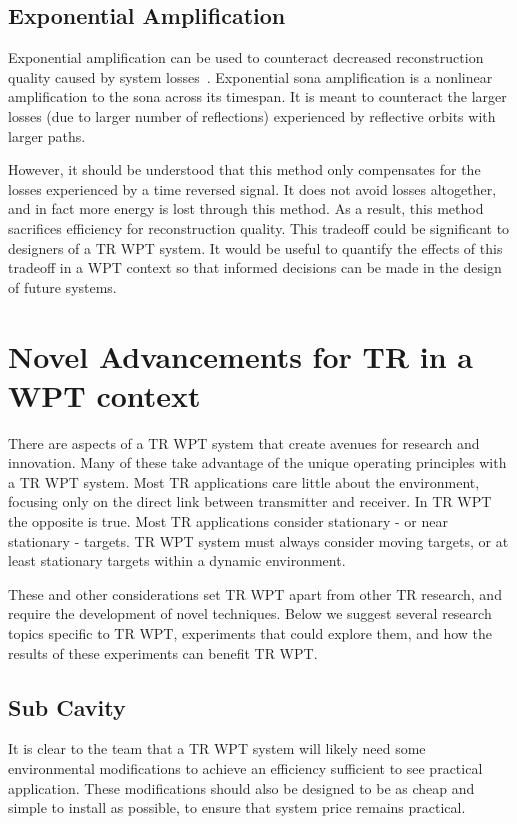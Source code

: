 \subsection{Exponential Amplification}

Exponential amplification can be used to counteract decreased reconstruction quality caused by system losses~\cite{bini-thesis}. Exponential sona amplification is a nonlinear amplification to the sona across its timespan. It is meant to counteract the larger losses (due to larger number of reflections) experienced by reflective orbits with larger paths.

However, it should be understood that this method only compensates for the losses experienced by a time reversed signal. It does not avoid losses altogether, and in fact more energy is lost through this method. As a result, this method sacrifices efficiency for reconstruction quality. This tradeoff could be significant to designers of a TR WPT system. It would be useful to quantify the effects of this tradeoff in a WPT context so that informed decisions can be made in the design of future systems.

\section{Novel Advancements for TR in a WPT context}
\label{sec:future-wpt}

There are aspects of a TR WPT system that create avenues for research and innovation. Many of these take advantage of the unique operating principles with a TR WPT system. Most TR applications care little about the environment, focusing only on the direct link between transmitter and receiver. In TR WPT the opposite is true. Most TR applications consider stationary - or near stationary - targets. TR WPT system must always consider moving targets, or at least stationary targets within a dynamic environment.

These and other considerations set TR WPT apart from other TR research, and require the development of novel techniques. Below we suggest several research topics specific to TR WPT, experiments that could explore them, and how the results of these experiments can benefit TR WPT.

\subsection{Sub Cavity}

It is clear to the team that a TR WPT system will likely need some environmental modifications to achieve an efficiency sufficient to see practical application. These modifications should also be designed to be as cheap and simple to install as possible, to ensure that system price remains practical.

